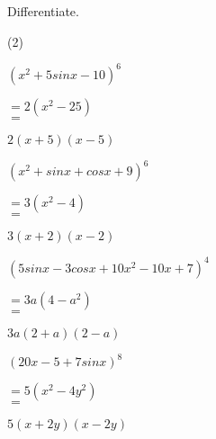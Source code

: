 \clearpage
\noindent Differentiate.
\begin{tasks}(2)
    \task \begin{exercise}$(x^2+5sinx-10)^6$
              \begin{envSolution}
                 $ =2(x^2-25)   $\\ 
                 $ =$			 
                     \begin{shortsolution}
  	                    $ 2(x+5)(x-5)$
                     \end{shortsolution}
              \end{envSolution}%
          \end{exercise}
 
    \task \begin{exercise}$(x^2+sinx+cosx+9)^6$
              \begin{envSolution}
                 $ =3(x^2-4)   $\\ 
                 $ =$			 
                     \begin{shortsolution}
  	                    $ 3(x+2)(x-2)$
                     \end{shortsolution}
              \end{envSolution}%
          \end{exercise}
 
    \task \begin{exercise}$(5sinx-3cosx+10x^2-10x+7)^4$
              \begin{envSolution}
                 $ =3a(4-a^2)   $\\ 
                 $ =$			 
                     \begin{shortsolution}
  	                    $ 3a(2+a)(2-a)$
                     \end{shortsolution}
              \end{envSolution}%
          \end{exercise}

    \task \begin{exercise}$(20x-5+7sinx)^8$
              \begin{envSolution}
                 $ =5(x^2-4y^2)   $\\
                 $ =$			 
                     \begin{shortsolution}
  	                    $ 5(x+2y)(x-2y)$
                     \end{shortsolution}
              \end{envSolution}%
          \end{exercise}
 
\end{tasks}



